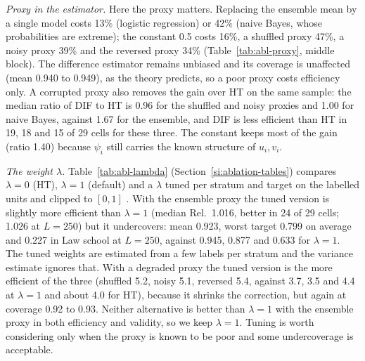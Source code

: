 \emph{Proxy in the estimator.} Here the proxy matters. Replacing the ensemble mean by a single model costs 13\% (logistic regression) or 42\% (naive Bayes, whose probabilities are extreme); the constant 0.5 costs 16\%, a shuffled proxy 47\%, a noisy proxy 39\% and the reversed proxy 34\% (Table~\ref{tab:abl-proxy}, middle block). The difference estimator remains unbiased and its coverage is unaffected (mean 0.940 to 0.949), as the theory predicts, so a poor proxy costs efficiency only. A corrupted proxy also removes the gain over HT on the same sample: the median ratio of DIF to HT is 0.96 for the shuffled and noisy proxies and 1.00 for naive Bayes, against 1.67 for the ensemble, and DIF is less efficient than HT in 19, 18 and 15 of 29 cells for these three. The constant keeps most of the gain (ratio 1.40) because $\psi_i$ still carries the known structure of $u_i,v_i$.

\begin{table}[t]
\centering\footnotesize
\setlength{\tabcolsep}{4pt}
\caption{Proxy ablation (A2). Eff.: median over all 29 cells of the median-over-targets efficiency vs SRS (plain estimator); Rel.: relative to PATTERN-DIF with the ensemble proxy (as in Table~); worst: mean over cells of the worst-target coverage; mean: mean coverage. In the first block the proxy enters only the allocation and the sample is analysed with HT; in the second it enters allocation and estimator; in the third only the allocation, the estimator keeps the ensemble proxy. The true-label proxy is not defined as an estimator proxy (the estimator would be exact).}
\label{tab:abl-proxy}
\resizebox{\textwidth}{!}{}
\end{table}

\emph{The weight $\lambda$.} Table~\ref{tab:abl-lambda} (Section~\ref{si:ablation-tables}) compares $\lambda=0$ (HT), $\lambda=1$ (default) and a $\lambda$ tuned per stratum and target on the labelled units and clipped to $[0,1]$ \citep[as in PPI++ and StratPPI;][]{angelopoulos2026ppipp,fisch2024stratppi}. With the ensemble proxy the tuned version is slightly more efficient than $\lambda=1$ (median Rel.\ 1.016, better in 24 of 29 cells; 1.026 at $L=250$) but it undercovers: mean 0.923, worst target 0.799 on average and 0.227 in Law school at $L=250$, against 0.945, 0.877 and 0.633 for $\lambda=1$. The tuned weights are estimated from a few labels per stratum and the variance estimate ignores that. With a degraded proxy the tuned version is the more efficient of the three (shuffled 5.2, noisy 5.1, reversed 5.4, against 3.7, 3.5 and 4.4 at $\lambda=1$ and about 4.0 for HT), because it shrinks the correction, but again at coverage 0.92 to 0.93. Neither alternative is better than $\lambda=1$ with the ensemble proxy in both efficiency and validity, so we keep $\lambda=1$. Tuning is worth considering only when the proxy is known to be poor and some undercoverage is acceptable.

